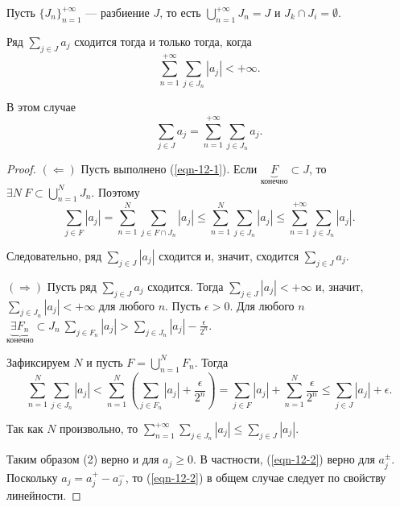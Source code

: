 
\begin{theorem}
    Пусть $\{J_n\}_{n = 1}^{+\infty}$ --- разбиение $J$, то есть $\bigcup_{n = 1}^{+\infty} J_n = J$ и $J_k \cap J_i = \emptyset$.

    Ряд $\sum_{j \in J} a_j$ сходится тогда и только тогда, когда
    \begin{equation}
        \label{eqn-12-1}
        \sum_{n = 1}^{+\infty} \sum_{j \in J_n} |a_j| < {+\infty}.
    \end{equation}

    В этом случае
    \begin{equation}
        \label{eqn-12-2}
        \sum_{j \in J} a_j = \sum_{n = 1}^{+\infty} \sum_{j \in J_n} a_j.
    \end{equation}

    \begin{proof}
        $(\Leftarrow)$ Пусть выполнено (\ref{eqn-12-1}). Если $\underbrace{F}_{\text{конечно}} \subset J$, то $\exists N \ F \subset \bigcup_{n = 1}^N J_n$. Поэтому
        \[
            \sum_{j \in F} |a_j| = \sum_{n = 1}^N \sum_{j \in F \cap J_n} |a_j| \le \sum_{n = 1}^N \sum_{j \in J_n} |a_j| \le \sum_{n = 1}^{+\infty} \sum_{j \in J_n} |a_j|.
        \]

        Следовательно, ряд $\sum_{j \in J} |a_j|$ сходится и, значит, сходится $\sum_{j \in J} a_j$.

        $(\Rightarrow)$ Пусть ряд $\sum_{j \in J} a_j$ сходится. Тогда $\sum_{j \in J} |a_j| < {+\infty}$ и, значит, $\sum_{j \in J_n} |a_j| < {+\infty}$ для любого $n$. Пусть $\epsilon > 0$. Для любого $n$ $\underbrace{\exists F_n}_{\text{конечно}} \subset J_n \ \sum_{j \in F_n} |a_j| > \sum_{j \in J_n} |a_j| - \frac{\epsilon}{2^n}$.

        Зафиксируем $N$ и пусть $F = \bigcup_{n = 1}^N F_n$. Тогда
        \[
            \sum_{n = 1}^N \sum_{j \in J_n} |a_j| < \sum_{n = 1}^N \left(\sum_{j \in F_n} |a_j| + \frac{\epsilon}{2^n}\right) = \sum_{j \in F} |a_j| + \sum_{n = 1}^N \frac{\epsilon}{2^n} \le \sum_{j \in J} |a_j| + \epsilon.
        \]

        Так как $N$ произвольно, то $\sum_{n = 1}^{+\infty} \sum_{j \in J_n} |a_j| \le \sum_{j \in J} |a_j|$.

        Таким образом (2) верно и для $a_j \ge 0$. В частности, (\ref{eqn-12-2}) верно для $a_j^\pm$. Поскольку $a_j = a_j^+ - a_j^-$, то (\ref{eqn-12-2}) в общем случае следует по свойству линейности.
    \end{proof}
\end{theorem}

